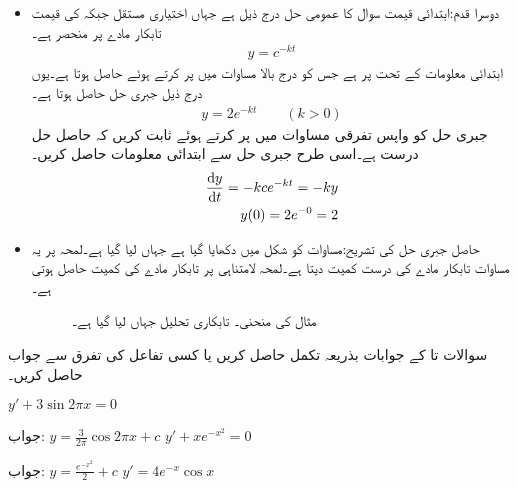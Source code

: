 \begin{itemize}
\item
دوسرا قدم:ابتدائی قیمت سوال کا عمومی حل درج ذیل ہے جہاں  اختیاری مستقل جبکہ  کی قیمت تابکار مادے پر منحصر ہے۔
\begin{align}
y=c^{-kt}
\end{align}
ابتدائی معلومات کے تحت  پر  ہے جس کو درج بالا مساوات میں پر کرتے ہوئے  حاصل ہوتا ہے۔یوں درج ذیل جبری حل حاصل ہوتا ہے۔
\begin{align}\label{مساوات_سادہ_اول_جبری_تابکاری}
y=2e^{-kt}\quad \quad (k>0)
\end{align} 
جبری حل کو واپس تفرقی مساوات میں پر کرتے ہوئے ثابت کریں کہ حاصل حل درست ہے۔اسی طرح جبری حل سے ابتدائی معلومات حاصل کریں۔
\begin{align*}
\frac{\dif y}{\dif t}=-k ce^{-kt}=-ky\\
y(0)=2e^{-0}=2
\end{align*}
%
\item
حاصل جبری حل کی تشریح:مساوات  کو شکل  میں دکھایا گیا ہے جہاں  لیا گیا ہے۔لمحہ  پر یہ مساوات تابکار مادے کی درست کمیت دیتا ہے۔لمحہ لامتناہی پر تابکار مادے کی کمیت  حاصل ہوتی ہے۔
\begin{figure}
\centering
{}
\caption{مثال  کی منحنی۔ تابکاری تحلیل  جہاں  لیا گیا ہے۔}
\label{شکل_مثال_اول_سادہ_تابکاری_الف}
\end{figure} 
%
\end{itemize}

سوالات  تا  کے جوابات بذریعہ تکمل حاصل کریں یا کسی تفاعل کی تفرق سے جواب حاصل کریں۔

\quad
$y'+3\sin 2\pi x=0$

جواب:\quad
  $y=\frac{3}{2\pi} \cos 2\pi x+c$
\quad
$y'+xe^{-x^2}=0$

جواب:\quad
$y=\tfrac{e^{-x^2}}{2}+c$
\quad
$y'=4e^{-x}\cos x$

